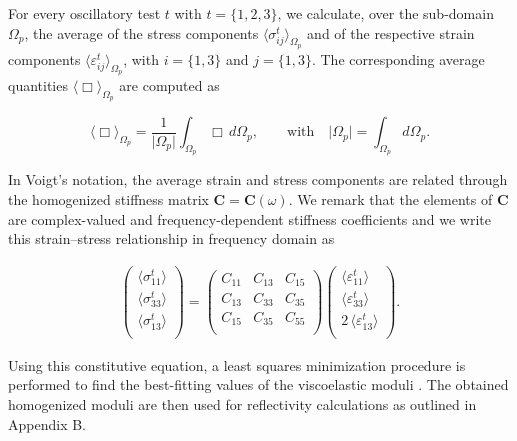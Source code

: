 \documentclass[draft]{agujournal2019}
\begin{document}
For every oscillatory test $t$ with $t = \{1,2,3\}$, we calculate, over the sub-domain $\Omega_p$, the average  of the stress components $\langle \sigma_{ij}^t \rangle_{\Omega_p}$ and of the respective strain components $\langle \varepsilon_{ij}^t \rangle_{\Omega_p}$, with $i=\{1,3\}$ and $j=\{1,3\}$. The corresponding average quantities $\langle \Box \rangle_{\Omega_p}$ are computed as
\begin{linenomath*}
\begin{equation}\label{Eq.12}
  \langle \Box \rangle_{\Omega_p} = \frac{1}{\vert \Omega_p \vert} \int_{\Omega_p} \Box \, d\Omega_p, \qquad \text{with} \quad  \vert \Omega_p \vert = \int_{\Omega_p}  d \Omega_p.
\end{equation}
\end{linenomath*}

In Voigt's notation, the average strain and stress components are related through the homogenized stiffness matrix $\bm{C} = \bm{C} (\omega) $. We remark that the elements of $\bm{C}$  are complex-valued and frequency-dependent stiffness coefficients and we write this strain--stress relationship in frequency domain as
\begin{linenomath*}
\begin{equation}\label{Eq.13}
 \begin{split}
 \begin{pmatrix}
 \langle \sigma_{11}^t\rangle \\
 \langle \sigma_{33}^t\rangle \\
  \langle\sigma_{13}^t\rangle \\
 \end{pmatrix}
 =
   \begin{pmatrix}
  C_{11} & C_{13} & C_{15} \\
  C_{13} & C_{33} & C_{35} \\
  C_{15} & C_{35} & C_{55}\\
 \end{pmatrix}
  \begin{pmatrix}
 \langle\varepsilon_{11}^t \rangle \\
 \langle \varepsilon_{33}^t \rangle \\
 2\, \langle \varepsilon_{13}^t \rangle \\
 \end{pmatrix}.
 \end{split}
\end{equation}
\end{linenomath*}

Using this constitutive equation, a least squares minimization procedure is performed to find the best-fitting values of the viscoelastic moduli \cite{Rubino2016}. The obtained homogenized moduli are then used for reflectivity calculations as outlined in Appendix B.
\end{document}

